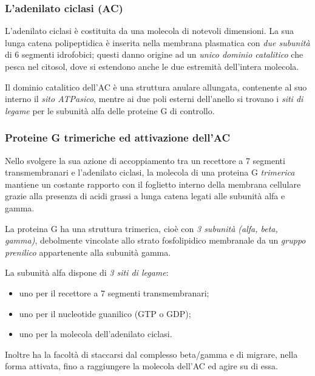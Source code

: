 \documentclass[]{article}
\begin{document}
\subsubsection{L'adenilato ciclasi (AC)}\label{ladenilato-ciclasi-ac}

L'adenilato ciclasi è costituita da una molecola di notevoli dimensioni.
La sua lunga catena polipeptidica è inserita nella membrana plasmatica
con \emph{due subunità} di 6 segmenti idrofobici; questi danno origine
ad un \emph{unico dominio catalitico} che pesca nel citosol, dove si
estendono anche le due estremità dell'intera molecola.

Il dominio catalitico dell'AC è una struttura anulare allungata,
contenente al suo interno il \emph{sito ATPasico}, mentre ai due poli
esterni dell'anello si trovano i \emph{siti di legame} per le subunità
alfa delle proteine G di controllo.

\subsubsection{Proteine G trimeriche ed attivazione
dell'AC}\label{proteine-g-trimeriche-ed-attivazione-dellac}

Nello svolgere la sua azione di accoppiamento tra un recettore a 7
segmenti transmembranari e l'adenilato ciclasi, la molecola di una
proteina G \emph{trimerica} mantiene un costante rapporto con il
foglietto interno della membrana cellulare grazie alla presenza di acidi
grassi a lunga catena legati alle subunità alfa e gamma.

La proteina G ha una struttura trimerica, cioè con \emph{3 subunità
(alfa, beta, gamma)}, debolmente vincolate allo strato fosfolipidico
membranale da un \emph{gruppo prenilico} appartenente alla subunità
gamma.

La subunità alfa dispone di \emph{3 siti di legame}:

\begin{itemize}
\itemsep1pt\parskip0pt
\item
  uno per il recettore a 7 segmenti transmembranari;
\item
  uno per il nucleotide guanilico (GTP o GDP);
\item
  uno per la molecola dell'adenilato ciclasi.
\end{itemize}

Inoltre ha la facoltà di staccarsi dal complesso beta/gamma e di
migrare, nella forma attivata, fino a raggiungere la molecola dell'AC ed
agire su di essa.
\end{document}
